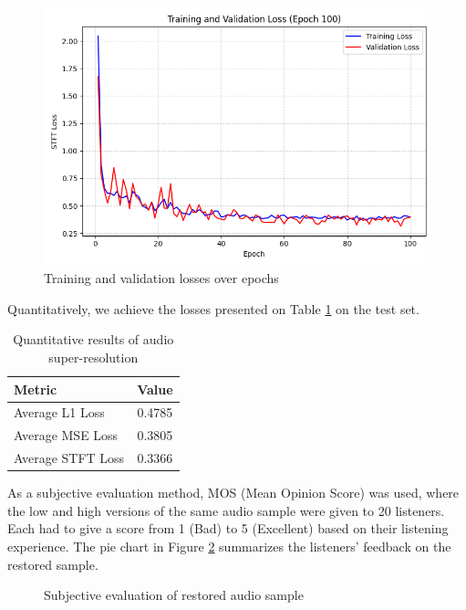 \documentclass{article}
\begin{document}
\begin{figure}[!htb]
    \centering
    \includegraphics[width=1\linewidth]{images/training.png}
    \vspace{-0.7cm} %
    \caption{Training and validation losses over epochs}
    \label{fig:training}
\end{figure}

Quantitatively, we achieve the losses presented on Table \ref{tab:results} on the test set.

\begin{table}[!htb]
    \centering
    \begin{tabular}{lc}
        \toprule
        \textbf{Metric} & \textbf{Value} \\
        \midrule
        Average L1 Loss & 0.4785 \\
        Average MSE Loss & 0.3805 \\
        Average STFT Loss & 0.3366 \\
        \bottomrule
    \end{tabular}
    \caption{Quantitative results of audio super-resolution}
    \label{tab:results}
\end{table}

As a subjective evaluation method, MOS (Mean Opinion Score) was used, where the low and high versions of the same audio sample were given to 20 listeners.
Each had to give a score from 1 (Bad) to 5 (Excellent) based on their listening experience.
The pie chart in Figure \ref{fig:qualitative} summarizes the listeners' feedback on the restored sample.

\begin{figure}[!htb]
    \centering
    \caption{Subjective evaluation of restored audio sample}
    \label{fig:qualitative}
\end{figure}
\end{document}
